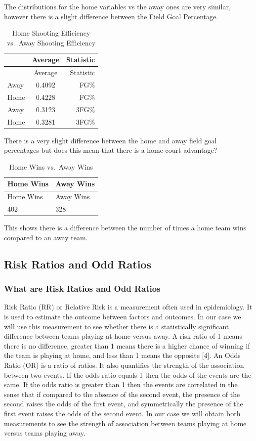 \documentclass[]{book}
\begin{document}
The distributions for the home variables vs the away ones are very similar, however there is a slight difference between the Field Goal Percentage.

\begin{longtable}[]{@{}lcr@{}}
\caption{\label{tab:home-away} Home Shooting Efficiency vs.~Away Shooting Efficiency}\tabularnewline
\toprule
& Average & Statistic\tabularnewline
\midrule
\endfirsthead
\toprule
& Average & Statistic\tabularnewline
\midrule
\endhead
Away & 0.4092 & FG\%\tabularnewline
Home & 0.4228 & FG\%\tabularnewline
Away & 0.3123 & 3FG\%\tabularnewline
Home & 0.3281 & 3FG\%\tabularnewline
\bottomrule
\end{longtable}

There is a very slight difference between the home and away field goal percentages but does this mean that there is a home court advantage?

\begin{longtable}[]{@{}ll@{}}
\caption{\label{tab:homewins-awaywins} Home Wins vs.~Away Wins}\tabularnewline
\toprule
Home Wins & Away Wins\tabularnewline
\midrule
\endfirsthead
\toprule
Home Wins & Away Wins\tabularnewline
\midrule
\endhead
402 & 328\tabularnewline
\bottomrule
\end{longtable}

This shows there is a difference between the number of times a home team wins compared to an away team.

\hypertarget{risk-ratios-and-odd-ratios}{%
\subsection{Risk Ratios and Odd Ratios}\label{risk-ratios-and-odd-ratios}}

\hypertarget{what-are-risk-ratios-and-odd-ratios}{%
\subsubsection{What are Risk Ratios and Odd Ratios}\label{what-are-risk-ratios-and-odd-ratios}}

Risk Ratio (RR) or Relative Risk is a measurement often used in epidemiology. It is used to estimate the outcome between factors and outcomes. In our case we will use this measurement to see whether there is a statistically significant difference between teams playing at home versus away. A risk ratio of 1 means there is no difference, greater than 1 means there is a higher chance of winning if the team is playing at home, and less than 1 means the opposite {[}4{]}.
An Odds Ratio (OR) is a ratio of ratios. It also quantifies the strength of the association between two events. If the odds ratio equals 1 then the odds of the events are the same. If the odds ratio is greater than 1 then the events are correlated in the sense that if compared to the absence of the second event, the presence of the second raises the odds of the first event, and symmetrically the presence of the first event raises the odds of the second event.
In our case we will obtain both measurements to see the strength of association between teams playing at home versus teams playing away.
\end{document}
